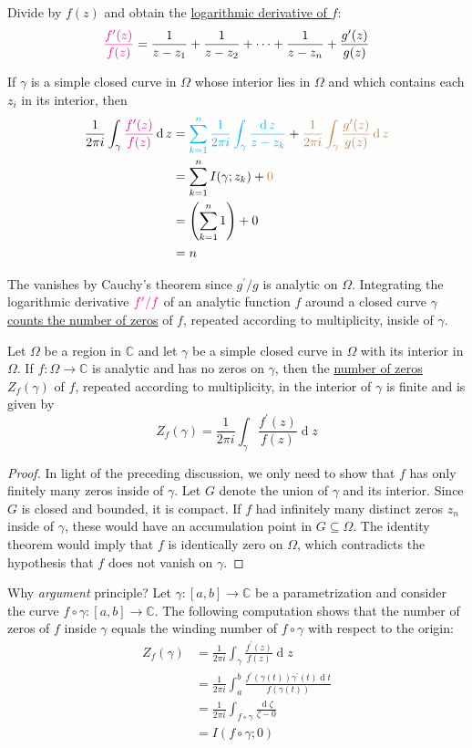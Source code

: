 \documentclass[12pt]{article}
\renewcommand{\d}{\ensuremath{\operatorname{d}}}
\begin{document}
Divide by $f(z)$ and obtain the \uline{logarithmic derivative of $f$}:
\[\textcolor{magenta}{\frac{f^{\prime}(z)}{f(z)}}=\frac{1}{z-z_1}+\frac{1}{z-z_2}+\cdots+\frac{1}{z-z_n}+\frac{g^{\prime}(z)}{g(z)} \]

If $\gamma$ is a simple closed curve in $\Omega$ whose interior lies in $\Omega$ and which contains each $z_i$ in its interior, then
\[\begin{aligned}
    \frac{1}{2 \pi i} \int_\gamma \rt{\frac{f^{\prime}(z)}{f(z)}} \d z & =\bt{\sum_{k=1}^n \frac{1}{2 \pi i} \int_\gamma \frac{\d z}{z-z_k}}+\gt{\frac{1}{2 \pi i} \int_\gamma \frac{g^{\prime}(z)}{g(z)} \d z} \\
    &= \sum_{k=1}^{n}I(\gamma;z_k) + \gt{0}\\
    & =\left(\sum_{k=1}^n 1\right)+0 \\
    & =n 
    \end{aligned}\]

The  vanishes by Cauchy's theorem since $g^{\prime} / g$ is analytic on $\Omega$. Integrating the logarithmic derivative $\textcolor{magenta}{f^{\prime} / f}$ of an analytic function $f$ around a closed curve $\gamma$ \uline{counts the number of zeros} of $f$, repeated according to multiplicity, inside of $\gamma$.

 Let $\Omega$ be a region in $\mathbb{C}$ and let $\gamma$ be a simple closed curve in $\Omega$ with its interior in $\Omega$. If $f:\Omega\to\mathbb{C}$ is analytic and has no zeros on $\gamma$, then the \underline{number of zeros} $Z_{f}(\gamma)$ of $f$, repeated according to multiplicity, in the interior of $\gamma$ is finite and is given by
    \[Z_{f}(\gamma)=\frac{1}{2\pi i}\int_{\gamma}\frac{f^{\prime}(z)}{f(z)}\d z\]
\begin{proof}
    In light of the preceding discussion, we only need to show that $f$ has only finitely many zeros inside of $\gamma$. Let $G$ denote the union of $\gamma$ and its interior. Since $G$ is closed and bounded, it is compact. If $f$ had infinitely many distinct zeros $z_{n}$ inside of $\gamma$, these would have an accumulation point in $G\subseteq\Omega$. The identity theorem would imply that $f$ is identically zero on $\Omega$, which contradicts the hypothesis that $f$ does not vanish on $\gamma$.
\end{proof}

\rmk Why \textit{argument} principle? Let $\gamma:[a,b]\rightarrow\mathbb{C}$ be a parametrization and consider the curve $f\circ\gamma:[a,b]\rightarrow\mathbb{C}$. The following computation shows that the number of zeros of $f$ inside $\gamma$ equals the winding number of $f\circ\gamma$ with respect to the origin:
\begin{align*}
    Z_{f}(\gamma)&=\frac{1}{2\pi i}\int_{\gamma}\frac{f^{\prime}(z)}{f(z)}\d z\\
    &=\frac{1}{2\pi i}\int_{a}^{b}\frac{f^{\prime}(\gamma(t))\gamma^{\prime}(t)\d t}{f(\gamma(t))}\\
    &=\frac{1}{2\pi i}\int_{f\circ\gamma}\frac{\d \zeta}{\zeta-0}\\
    &=I(f\circ\gamma;0)
\end{align*}
\end{document}
